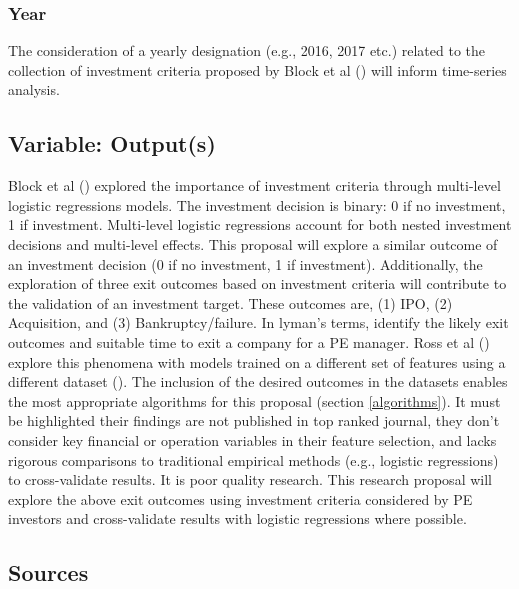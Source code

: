 \documentclass[12pt]{article}
\begin{document}
\subsubsection{Year}
The consideration of a yearly designation (e.g., 2016, 2017 etc.) related to the collection of investment criteria proposed by Block et al (\citeyear{BLOCK2019329}) will inform time-series analysis.
\subsection{Variable: Output(s)}
Block et al (\citeyear{BLOCK2019329}) explored the importance of investment criteria through multi-level logistic regressions models.
The investment decision is binary: 0 if no investment, 1 if investment. Multi-level logistic regressions account for both nested investment decisions and multi-level effects.
This proposal will explore a similar outcome of an investment decision (0 if no investment, 1 if investment).
Additionally, the exploration of three exit outcomes based on investment criteria will contribute to the validation of an investment target.
These outcomes are, (1) IPO, (2) Acquisition, and (3) Bankruptcy/failure.
In lyman's terms, identify the likely exit outcomes and suitable time to exit a company for a PE manager.
Ross et al (\citeyear{ross2021capitalvx}) explore this phenomena with models trained on a different set of features using a different dataset (\cite{CB}).
The inclusion of the desired outcomes in the datasets enables the most appropriate algorithms for this proposal (section \ref{algorithms}).
It must be highlighted their findings are not published in top ranked journal, they don't consider key financial or operation variables in their feature selection,
and lacks rigorous comparisons to traditional empirical methods (e.g., logistic regressions) to cross-validate results. It is poor quality research.
This research proposal will explore the above exit outcomes using investment criteria considered by PE investors and cross-validate results with logistic regressions where possible.
\subsection{Sources}
\end{document}
